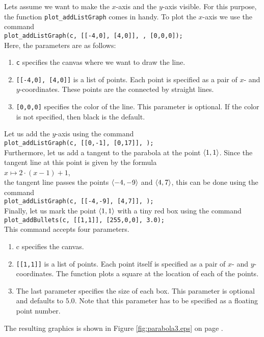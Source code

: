 Lets assume we want to make the $x$-axis and the $y$-axis visible.  For this purpose, the
function \texttt{plot\_addListGraph} comes in handy.  To plot the $x$-axis we use the command
\\[0.2cm]
\hspace*{1.3cm}
\texttt{plot\_addListGraph(c, [[-4,0], [4,0]], , [0,0,0]);}
\\[0.2cm]
Here, the parameters are as follows:
\begin{enumerate}
\item \texttt{c} specifies the canvas where we want to draw the line.
\item \texttt{[[-4,0], [4,0]]} is a list of points.  Each point is specified as a pair of $x$-
      and $y$-coordinates.  These points are the connected by straight lines.
\item \texttt{[0,0,0]} specifies the color of the line.  This parameter is optional.
      If the color is not specified, then black is the default.
\end{enumerate}
Let us add the $y$-axis using the command
\\[0.2cm]
\hspace*{1.3cm}
\texttt{plot\_addListGraph(c, [[0,-1], [0,17]], );}
\\[0.2cm]
Furthermore, let us add a tangent to the parabola at the point $\pair(1,1)$.  Since the tangent line
at this point is given by the formula
\\[0.2cm]
\hspace*{1.3cm}
$x \mapsto 2 \cdot(x-1) + 1$,
\\[0.2cm]
the tangent line passes the points $\pair(-4, -9)$ and $\pair(4,7)$, this can be done
using the command
\\[0.2cm]
\hspace*{1.3cm}
\texttt{plot\_addListGraph(c, [[-4,-9], [4,7]], );}
\\[0.2cm]
Finally, let us mark the point $\pair(1,1)$ with a tiny red box using the command
\\[0.2cm]
\hspace*{1.3cm}
\texttt{plot\_addBullets(c, [[1,1]], [255,0,0], 3.0);}
\\[0.2cm]
This command accepts four parameters.
\begin{enumerate}
\item \textrm{c} specifies the canvas.
\item \texttt{[[1,1]]} is a list of points.  Each point itself is specified as a pair of $x$- and $y$-
      coordinates. The function plots a square at the location of each of the points.
\item The last parameter specifies the size of each box.  This parameter is optional and
      defaults to $5.0$.  Note that this parameter has to be specified as a floating point number.
\end{enumerate}
The resulting graphics is shown in Figure \ref{fig:parabola3.eps} on page
\pageref{fig:parabola3.eps}.


